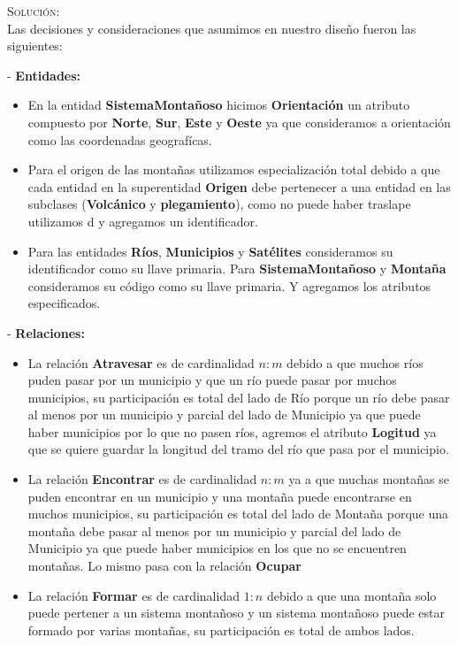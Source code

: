 \documentclass[letterpaper,11pt]{article}
\begin{document}
\begin{itemize}
 \textsc{Solución:}\\
 Las decisiones y consideraciones que asumimos en nuestro diseño fueron 
las siguientes: 

- \textbf{Entidades:} 
\begin{itemize}
\item En la entidad \textbf{SistemaMontañoso} hicimos \textbf{Orientación} 
      un atributo compuesto por \textbf{Norte}, \textbf{Sur}, \textbf{Este}
      y \textbf{Oeste} ya que consideramos a orientación como las coordenadas
      geografícas.
\item Para el origen de las montañas utilizamos especialización total debido
      a que cada entidad en la superentidad \textbf{Origen} debe pertenecer a 
      una entidad en las subclases (\textbf{Volcánico} y \textbf{plegamiento}), 
      como no puede haber traslape utilizamos d y agregamos un identificador.      
\item Para las entidades \textbf{Ríos}, \textbf{Municipios} y \textbf{Satélites}
      consideramos su identificador como su llave primaria. Para \textbf{SistemaMontañoso}
      y \textbf{Montaña} consideramos su código como su llave primaria. Y agregamos 
      los atributos especificados.
\end{itemize}

- \textbf{Relaciones: } 
\begin{itemize}
\item La relación \textbf{Atravesar} es de cardinalidad $n:m$ debido 
      a que muchos ríos puden pasar por un municipio y que un río puede 
      pasar por muchos municipios, su participación es total del lado de 
      Río porque un río debe pasar al menos por un municipio y parcial del 
      lado de Municipio ya que puede haber municipios por lo que no pasen ríos, 
      agremos el atributo \textbf{Logitud} ya que se quiere guardar la longitud
      del tramo del río que pasa por el municipio.
\item La relación \textbf{Encontrar} es de cardinalidad $n:m$ ya
      a que muchas montañas se puden encontrar en un municipio y una montaña puede 
      encontrarse en muchos municipios, su participación es total del lado de 
     Montaña porque una montaña debe pasar al menos por un municipio y parcial del 
     lado de Municipio ya que puede haber municipios en los que no se encuentren 
     montañas. Lo mismo pasa con la relación \textbf{Ocupar}

\item La relación \textbf{Formar} es de cardinalidad $1:n$ debido a que una montaña 
      solo puede pertener a un sistema montañoso y un sistema montañoso puede estar
      formado por varias montañas, su participación es total de ambos lados. 


\end{itemize}
\end{itemize}
\end{document}
